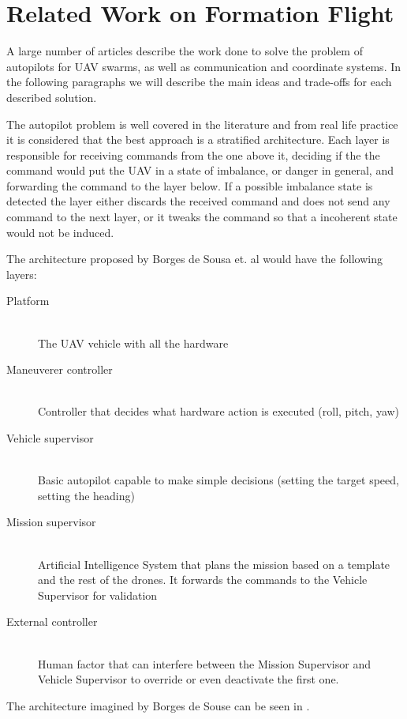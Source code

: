 \chapter{Related Work on Formation Flight}
\label{chapter:related-work}

A large number of articles describe the work done to solve the problem of autopilots for
UAV swarms, as well as communication and coordinate systems. In the following paragraphs 
we will describe the main ideas and trade-offs for each described solution.

The autopilot problem is well covered in the literature and from real life practice
it is considered that the best approach is a stratified architecture. Each layer
is responsible for receiving commands from the one above it, deciding if the
the command would put the UAV in a state of imbalance, or danger in general, and
forwarding the command to the layer below. If a possible imbalance state is detected
the layer either discards the received command and does not send any command to 
the next layer, or it tweaks the command so that a incoherent state would not
be induced.

The architecture proposed by Borges de Sousa et. al \cite{pivant} would have
the following layers:

\begin{description}
\item[Platform] \hfill \\ The UAV vehicle with all the hardware
\item[Maneuverer controller] \hfill \\ Controller that decides what hardware action is 
executed (roll, pitch, yaw)
\item[Vehicle supervisor] \hfill \\ Basic autopilot capable to make simple decisions 
(setting the target speed, setting the heading)
\item[Mission supervisor] \hfill \\ Artificial Intelligence System that plans the mission
based on a template and the rest of the drones. It forwards the commands to the
Vehicle Supervisor for validation
\item[External controller] \hfill \\ Human factor that can interfere between the Mission
Supervisor and Vehicle Supervisor to override or even deactivate the first one.
\end{description}

The architecture imagined by Borges de Souse can be seen in .

